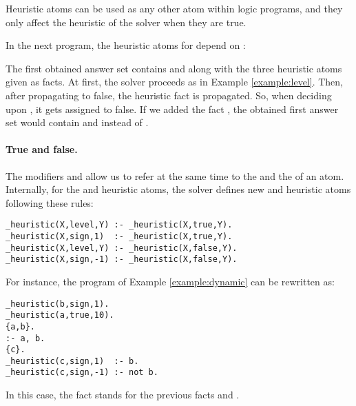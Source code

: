 Heuristic atoms can be used as any other atom within logic programs,
and they only affect the heuristic of the solver when they are true.
\begin{example}
\label{example:dynamic}
In the next program, the heuristic atoms for  depend on :

The first obtained answer set contains  and  along with the three heuristic atoms given as facts.
At first, the solver proceeds as in Example \ref{example:level}.
Then, after propagating  to false,  
the heuristic fact  is propagated.
So, when deciding upon , it gets assigned to false.  
If we added the fact ,
the obtained first answer set would contain  and  instead of .
\end{example}

\paragraph{True and false.}

 The modifiers  and  allow us to refer at the same time to the  and the  of an atom.
 Internally,  for the  and  heuristic atoms,
 the solver defines new  and  heuristic atoms following these rules:
\begin{lstlisting}[numbers=none]
_heuristic(X,level,Y) :- _heuristic(X,true,Y).
_heuristic(X,sign,1)  :- _heuristic(X,true,Y).
_heuristic(X,level,Y) :- _heuristic(X,false,Y).
_heuristic(X,sign,-1) :- _heuristic(X,false,Y).
\end{lstlisting}
For instance, the program of Example \ref{example:dynamic}
can be rewritten as:
\begin{lstlisting}[numbers=none]
_heuristic(b,sign,1).
_heuristic(a,true,10).
{a,b}.
:- a, b.
{c}.
_heuristic(c,sign,1)  :- b.
_heuristic(c,sign,-1) :- not b.
\end{lstlisting}
In this case, the fact  stands for the previous
facts  and .

